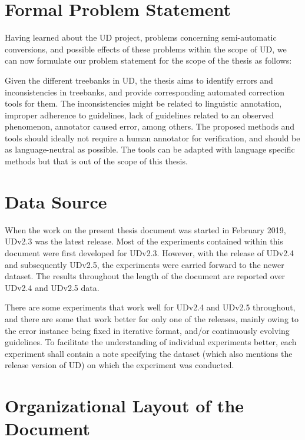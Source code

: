 \section{Formal Problem Statement}

Having learned about the UD project, problems concerning semi-automatic conversions, and possible effects of these problems within the scope of UD, we can now formulate our problem statement for the scope of the thesis as follows:

Given the different treebanks in UD, the thesis aims to identify errors and inconsistencies in treebanks, and provide corresponding automated correction tools for them. The inconsistencies might be related to linguistic annotation, improper adherence to guidelines, lack of guidelines related to an observed phenomenon, annotator caused error, among others. The proposed methods and tools should ideally not require a human annotator for verification, and should be as language-neutral as possible. The tools can be adapted with language specific methods but that is out of the scope of this thesis.

\section{Data Source}

When the work on the present thesis document was started in February 2019, UDv2.3 \citep{UDv2.3} was the latest release. Most of the experiments contained within this document were first developed for UDv2.3. However, with the release of UDv2.4 and subsequently UDv2.5, the experiments were carried forward to the newer dataset. The results throughout the length of the document are reported over UDv2.4 and UDv2.5 data.

There are some experiments that work well for UDv2.4 and UDv2.5 throughout, and there are some that work better for only one of the releases, mainly owing to the error instance being fixed in iterative format, and/or continuously evolving guidelines. To facilitate the understanding of individual experiments better, each experiment shall contain a note specifying the dataset (which also mentions the release version of UD) on which the experiment was conducted.

\section{Organizational Layout of the Document}

